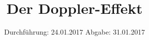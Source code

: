 

\subject{V104}
\title{Der Doppler-Effekt}
\date{
	\centering
	Durchführung: 24.01.2017
	\hspace{3em}
	Abgabe: 31.01.2017
}



\maketitle
\thispagestyle{empty}
\tableofcontents
\newpage








\printbibliography


